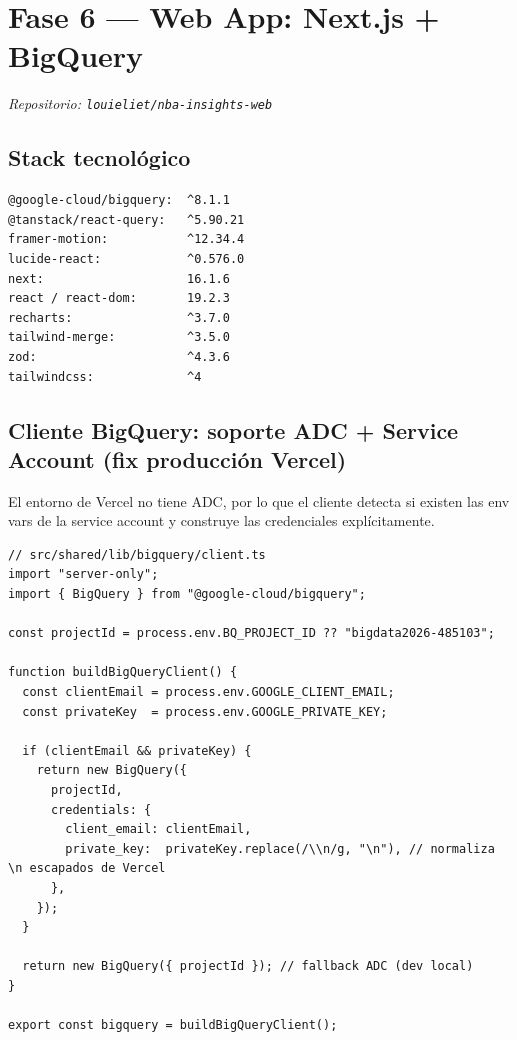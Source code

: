 \documentclass[12pt, letterpaper]{article}
\begin{document}
\section{Fase 6 — Web App: Next.js + BigQuery}
\textit{Repositorio: \texttt{louieliet/nba-insights-web}}

\subsection{Stack tecnológico}

\begin{lstlisting}[style=outputstyle, caption={Evidencia --- dependencias reales de \texttt{package.json}}]
@google-cloud/bigquery:  ^8.1.1
@tanstack/react-query:   ^5.90.21
framer-motion:           ^12.34.4
lucide-react:            ^0.576.0
next:                    16.1.6
react / react-dom:       19.2.3
recharts:                ^3.7.0
tailwind-merge:          ^3.5.0
zod:                     ^4.3.6
tailwindcss:             ^4
\end{lstlisting}

\subsection{Cliente BigQuery: soporte ADC + Service Account (fix producción Vercel)}

El entorno de Vercel no tiene ADC, por lo que el cliente detecta si existen las env vars de la service account y construye las credenciales explícitamente.

\begin{lstlisting}[style=codestyle, caption={Cliente BigQuery singleton — \texttt{src/shared/lib/bigquery/client.ts}}]
// src/shared/lib/bigquery/client.ts
import "server-only";
import { BigQuery } from "@google-cloud/bigquery";

const projectId = process.env.BQ_PROJECT_ID ?? "bigdata2026-485103";

function buildBigQueryClient() {
  const clientEmail = process.env.GOOGLE_CLIENT_EMAIL;
  const privateKey  = process.env.GOOGLE_PRIVATE_KEY;

  if (clientEmail && privateKey) {
    return new BigQuery({
      projectId,
      credentials: {
        client_email: clientEmail,
        private_key:  privateKey.replace(/\\n/g, "\n"), // normaliza \n escapados de Vercel
      },
    });
  }

  return new BigQuery({ projectId }); // fallback ADC (dev local)
}

export const bigquery = buildBigQueryClient();
\end{lstlisting}
\end{document}

